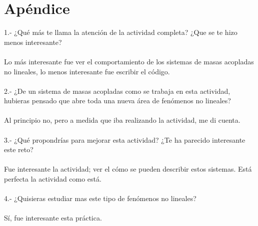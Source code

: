 \documentclass{article}
\begin{document}
\section{Apéndice}

1.- ¿Qué más te llama la atención de la actividad completa? ¿Que se te hizo menos interesante?
\\
\\
Lo más interesante fue ver el comportamiento de los sistemas de masas acopladas no lineales, lo menos interesante fue escribir el código.
\\
\\
2.- ¿De un sistema de masas acopladas como se trabaja en esta actividad, hubieras pensado que abre toda una nueva área de fenómenos no lineales?
\\
\\
Al principio no, pero a medida que iba realizando la actividad, me di cuenta.
\\
\\
3.- ¿Qué propondrías para mejorar esta actividad? ¿Te ha parecido interesante este reto?
\\
\\
Fue interesante la actividad; ver el cómo se pueden describir estos sistemas. Está perfecta la actividad como está.
\\
\\
4.- ¿Quisieras estudiar mas este tipo de fenómenos no lineales?
\\
\\
Sí, fue interesante esta práctica.
\end{document}
